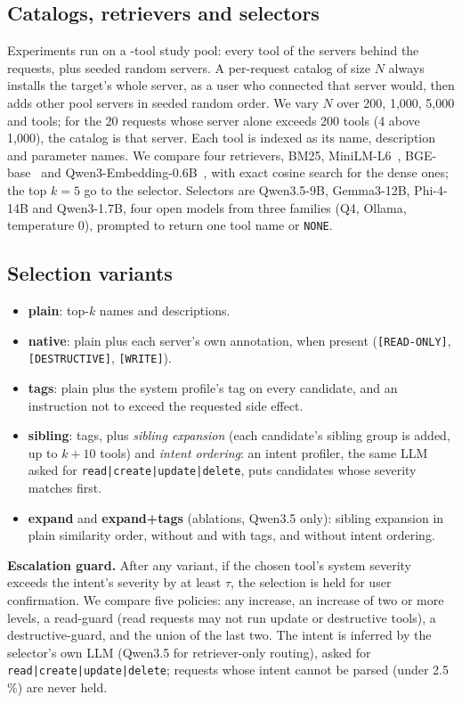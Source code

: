 \subsection{Catalogs, retrievers and selectors}
Experiments run on a \NumPoolTools{}-tool study pool: every tool of the
\NumQueryServers{} servers behind the requests, plus seeded random servers. A per-request catalog
of size $N$ always installs the target's whole server, as a user who connected that server would,
then adds other pool servers in seeded random order. We vary $N$ over 200, 1,000, 5,000 and \NumPoolTools{} tools; for the 20 requests whose server alone exceeds 200 tools (4 above 1,000), the
catalog is that server.
Each tool is indexed as its name, description and parameter names. We compare four retrievers,
BM25, MiniLM-L6~\cite{sbert}, BGE-base~\cite{bge} and Qwen3-Embedding-0.6B~\cite{qwen3emb}, with
exact cosine search for the dense ones; the top $k{=}5$ go to the selector. Selectors are Qwen3.5-9B, Gemma3-12B, Phi-4-14B and Qwen3-1.7B, four open models from three
families (Q4, Ollama, temperature 0), prompted to return one tool name or \texttt{NONE}.

\subsection{Selection variants}
\begin{itemize}
\item \textbf{plain}: top-$k$ names and descriptions.
\item \textbf{native}: plain plus each server's own annotation, when present
(\texttt{[READ-ONLY]}, \texttt{[DESTRUCTIVE]}, \texttt{[WRITE]}).
\item \textbf{tags}: plain plus the system profile's tag on every candidate, and an instruction
not to exceed the requested side effect.
\item \textbf{sibling}: tags, plus \emph{sibling expansion} (each candidate's sibling group is
added, up to $k{+}10$ tools) and \emph{intent ordering}: an intent profiler, the same LLM asked
for \texttt{read|create|update|delete}, puts candidates whose severity matches first.
\item \textbf{expand} and \textbf{expand+tags} (ablations, Qwen3.5 only): sibling expansion in plain
similarity order, without and with tags, and without intent ordering.
\end{itemize}
\textbf{Escalation guard.} After any variant, if the chosen tool's system severity exceeds the
intent's severity by at least $\tau$, the selection is held for user confirmation.
We compare five policies: any increase, an increase of two or more levels, a read-guard (read
requests may not run update or destructive tools), a destructive-guard, and the union of the last
two. The intent is inferred by the selector's own LLM (Qwen3.5 for retriever-only routing), asked
for \texttt{read|create|update|delete}; requests whose intent cannot be parsed (under 2.5\,\%) are
never held.

